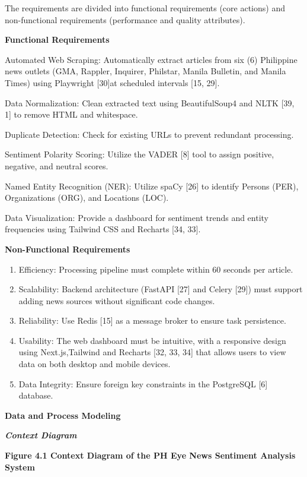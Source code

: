 The requirements are divided into functional requirements (core actions) and non-functional requirements (performance and quality attributes).

\textbf{Functional Requirements}

Automated Web Scraping: Automatically extract articles from six (6) Philippine news outlets (GMA, Rappler, Inquirer, Philstar, Manila Bulletin, and Manila Times) using Playwright {[}30{]}at scheduled intervals {[}15, 29{]}.

Data Normalization: Clean extracted text using BeautifulSoup4 and NLTK {[}39, 1{]} to remove HTML and whitespace.

Duplicate Detection: Check for existing URLs to prevent redundant processing.

Sentiment Polarity Scoring: Utilize the VADER {[}8{]} tool to assign positive, negative, and neutral scores.

Named Entity Recognition (NER): Utilize spaCy {[}26{]} to identify Persons (PER), Organizations (ORG), and Locations (LOC).

Data Visualization: Provide a dashboard for sentiment trends and entity frequencies using Tailwind CSS and Recharts {[}34, 33{]}.

\textbf{Non-Functional Requirements}

\begin{enumerate}
\def\labelenumi{\arabic{enumi}.}
\item
  Efficiency: Processing pipeline must complete within 60 seconds per article.
\item
  Scalability: Backend architecture (FastAPI {[}27{]} and Celery {[}29{]}) must support adding news sources without significant code changes.
\item
  Reliability: Use Redis {[}15{]} as a message broker to ensure task persistence.
\item
  Usability: The web dashboard must be intuitive, with a responsive design using Next.js,Tailwind and Recharts {[}32, 33, 34{]} that allows users to view data on both desktop and mobile devices.
\item
  Data Integrity: Ensure foreign key constraints in the PostgreSQL {[}6{]} database.
\end{enumerate}

\textbf{Data and Process Modeling}

\emph{\textbf{Context Diagram}}

\textbf{Figure 4.1 Context Diagram of the PH Eye News Sentiment Analysis System}

